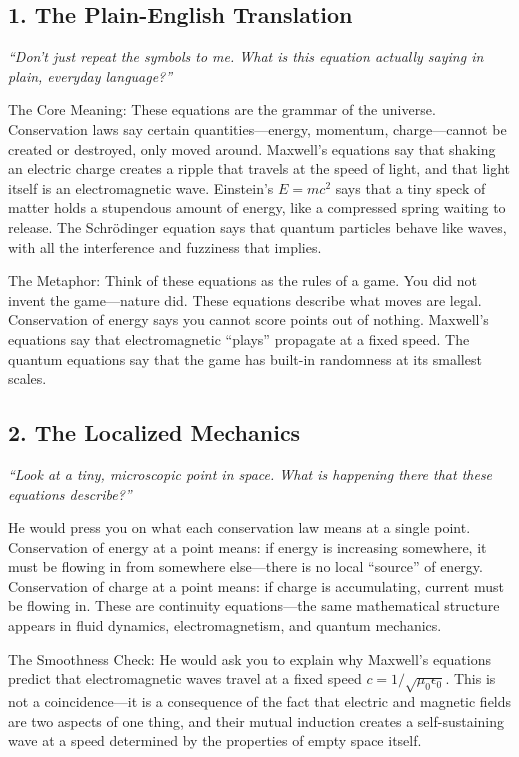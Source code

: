 \documentclass[11pt,openright]{book}
\begin{document}
\subsection*{1. The Plain-English Translation}
\textit{``Don't just repeat the symbols to me. What is this equation actually saying in plain, everyday language?''}

The Core Meaning: These equations are the grammar of the universe. Conservation laws say certain quantities---energy, momentum, charge---cannot be created or destroyed, only moved around. Maxwell's equations say that shaking an electric charge creates a ripple that travels at the speed of light, and that light itself is an electromagnetic wave. Einstein's $E = mc^2$ says that a tiny speck of matter holds a stupendous amount of energy, like a compressed spring waiting to release. The Schr\"odinger equation says that quantum particles behave like waves, with all the interference and fuzziness that implies.

The Metaphor: Think of these equations as the rules of a game. You did not invent the game---nature did. These equations describe what moves are legal. Conservation of energy says you cannot score points out of nothing. Maxwell's equations say that electromagnetic ``plays'' propagate at a fixed speed. The quantum equations say that the game has built-in randomness at its smallest scales.

\subsection*{2. The Localized Mechanics}
\textit{``Look at a tiny, microscopic point in space. What is happening there that these equations describe?''}

He would press you on what each conservation law means at a single point. Conservation of energy at a point means: if energy is increasing somewhere, it must be flowing in from somewhere else---there is no local ``source'' of energy. Conservation of charge at a point means: if charge is accumulating, current must be flowing in. These are continuity equations---the same mathematical structure appears in fluid dynamics, electromagnetism, and quantum mechanics.

The Smoothness Check: He would ask you to explain why Maxwell's equations predict that electromagnetic waves travel at a fixed speed $c = 1/\sqrt{\mu_0 \epsilon_0}$. This is not a coincidence---it is a consequence of the fact that electric and magnetic fields are two aspects of one thing, and their mutual induction creates a self-sustaining wave at a speed determined by the properties of empty space itself.
\end{document}

